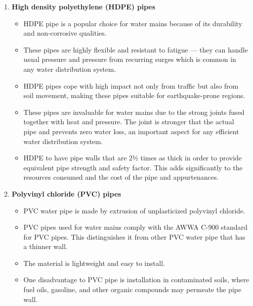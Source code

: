\begin{itemize}
\begin{enumerate}
\item \textbf{High density polyethylene (HDPE) pipes} 
\begin{itemize}
\item HDPE pipe is a popular choice for water mains because of its durability and non-corrosive qualities.
\item These pipes are highly flexible and resistant to fatigue — they can handle usual pressure and pressure from recurring surges which is common in any water distribution system.
\item HDPE pipes cope with high impact not only from traffic but also from soil movement, making these pipes suitable for earthquake-prone regions.
\item These pipes are invaluable for water mains due to the strong joints fused together with heat and pressure. The joint is stronger that the actual pipe and prevents zero water loss, an important aspect for any efficient water distribution system.
\item HDPE to have pipe walls that are 2½ times as  thick in order to provide equivalent pipe strength and safety factor. This adds significantly to the resources  consumed and the cost of the pipe and appurtenances.
\end{itemize}

\item \textbf{Polyvinyl chloride (PVC) pipes} 
\begin{itemize}
\item PVC water pipe is made by extrusion of unplasticized polyvinyl chloride. \item PVC pipes used for water mains comply with the AWWA C-900 standard for PVC pipes. This distinguishes it from other PVC water pipe that has a thinner wall.
\item The material is lightweight and easy to install. 
\item One disadvantage to PVC pipe is installation in contaminated soils, where fuel oils, gasoline, and other organic compounds may permeate the pipe wall.
\end{itemize}
\end{enumerate}
\end{itemize}

